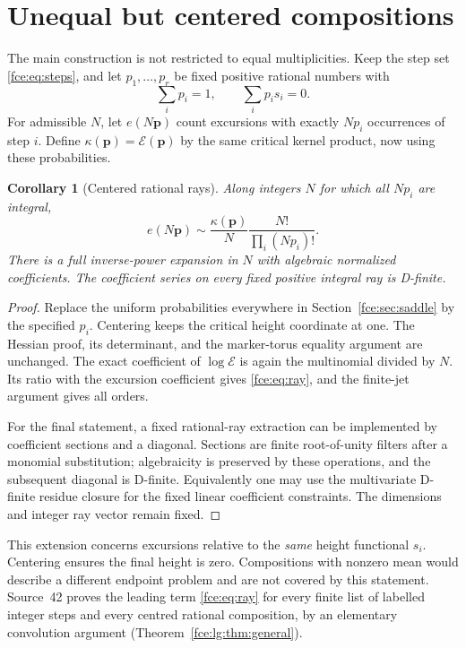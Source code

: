 \documentclass[11pt,a4paper]{article}
\numberwithin{equation}{section}
\newtheorem{corollary}[theorem]{Corollary}
\theoremstyle{definition}\newtheorem{definition}[theorem]{Definition}
\theoremstyle{remark}\newtheorem{remark}[theorem]{Remark}
\newcommand{\E}{\mathcal E}
\begin{document}
\section{Unequal but centered compositions}
The main construction is not restricted to equal multiplicities. Keep the
step set \eqref{fce:eq:steps}, and let $p_1,\ldots,p_r$ be fixed positive
rational numbers with
\[
 \sum_i p_i=1,\qquad \sum_i p_i s_i=0.
\]
For admissible $N$, let $e(N\boldsymbol p)$ count excursions with exactly
$Np_i$ occurrences of step $i$. Define
$\kappa(\boldsymbol p)=\E(\boldsymbol p)$ by the same critical kernel
product, now using these probabilities.

\begin{corollary}[Centered rational rays]\label{fce:cor:rays}
Along integers $N$ for which all $Np_i$ are integral,
\begin{equation}\label{fce:eq:ray}
 e(N\boldsymbol p)\sim
 \frac{\kappa(\boldsymbol p)}{N}\frac{N!}{\prod_i(Np_i)!}.
\end{equation}
There is a full inverse-power expansion in $N$ with algebraic normalized
coefficients. The coefficient series on every fixed positive integral
ray is D-finite.
\end{corollary}
\begin{proof}
Replace the uniform probabilities everywhere in Section~\ref{fce:sec:saddle}
by the specified $p_i$. Centering keeps the critical height coordinate at
one. The Hessian proof, its determinant, and the marker-torus equality
argument are unchanged. The exact coefficient of $\log\E$ is again the
multinomial divided by $N$. Its ratio with the excursion coefficient gives
\eqref{fce:eq:ray}, and the finite-jet argument gives all orders.

For the final statement, a fixed rational-ray extraction can be implemented
by coefficient sections and a diagonal. Sections are finite root-of-unity
filters after a monomial substitution; algebraicity is preserved by these
operations, and the subsequent diagonal is D-finite. Equivalently one
may use the multivariate D-finite residue closure for the fixed linear
coefficient constraints. The dimensions and integer ray vector remain
fixed.
\end{proof}
This extension concerns excursions relative to the \emph{same} height
functional $s_i$. Centering ensures the final height is zero. Compositions
with nonzero mean would describe a different endpoint problem and are
not covered by this statement. Source~42 proves the leading term
\eqref{fce:eq:ray} for every finite list of labelled integer steps and
every centred rational composition, by an elementary convolution argument
(Theorem~\ref{fce:lg:thm:general}).
\end{document}
